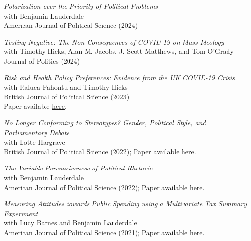 \documentclass[centered]{res}
\begin{document}
\begin{resume}
{\sl Polarization over the Priority of Political Problems} \\
with Benjamin Lauderdale \\
American Journal of Political Science (2024)

{\sl Testing Negative: The Non-Consequences of COVID-19 on Mass Ideology} \\
with Timothy Hicks, Alan M. Jacobs, J. Scott Matthews, and Tom O'Grady \\
Journal of Politics (2024)

{\sl Risk and Health Policy Preferences: Evidence from the UK COVID-19 Crisis} \\
with Raluca Pahontu and Timothy Hicks \\
British Journal of Political Science (2023) \\
Paper available \href{https://doi.org/10.1017/S0007123422000539} {here}.

{\sl No Longer Conforming to Stereotypes? Gender, Political Style, and Parliamentary Debate} \\
with Lotte Hargrave\\
British Journal of Political Science (2022); Paper available \href{https://www.jackblumenau.com/papers/gender_styles.pdf} {here}.

{\sl The Variable Persuasiveness of Political Rhetoric} \\
with Benjamin Lauderdale\\
American Journal of Political Science (2022); Paper available \href{https://www.jackblumenau.com/papers/persuasion.pdf} {here}.

{\sl Measuring Attitudes towards Public Spending using a Multivariate Tax Summary Experiment} \\
with Lucy Barnes and Benjamin Lauderdale\\
American Journal of Political Science (2021); Paper available \href{https://www.jackblumenau.com/papers/spending_experiment.pdf} {here}.











\end{resume}
\end{document}
